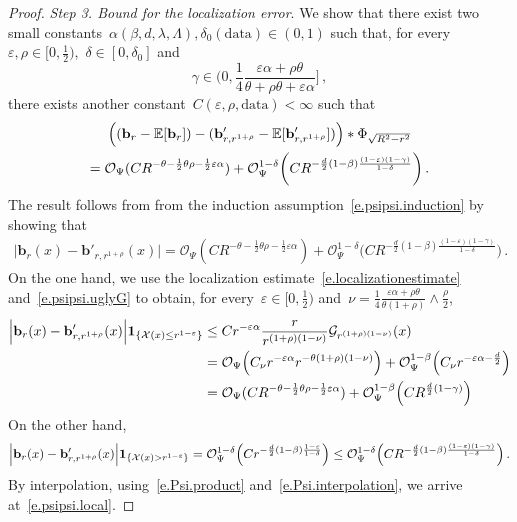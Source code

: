 \documentclass[11pt,twoside]{article} %
\numberwithin{equation}{section}
\theoremstyle{definition}
\newcommand{\eps}{\varepsilon}
\renewcommand{\b}{\ensuremath{\mathbf{b}}}
\newcommand{\ep}{\eps}
\newcommand{\E}{\mathbb{E}}
\newcommand{\X}{\mathcal{X}}
\renewcommand{\O}{\mathcal{O}}
\newcommand{\indc}{\boldsymbol{1}}
\newcommand{\data}{\mathrm{data}}
\begin{document}
\begin{proof}
\smallskip 


\emph{Step 3. Bound for the localization error}. 
We show that there exist two small constants~$\alpha(\beta,d,\lambda,\Lambda),\delta_0(\data) \in (0,1)$ such that, for every~$\ep,\rho \in [0,\frac12)$,~$\delta \in [0,\delta_0]$ and
\begin{equation} \label{e.psipsi.gamma1}
\gamma 
\in 
\biggl( 0, \frac14 \frac{\ep \alpha + \rho \theta}{\theta + \rho \theta + \ep\alpha} \biggl]\,, 
\end{equation}
there exists another constant~$C(\ep,\rho,\data) < \infty$ such that
\begin{multline}  \label{e.psipsi.local.buckle}
\Bigl( (\b_r - \E [ \b_r ]) - (\b'_{r,r^{1+\rho} } - \E [ \b'_{r,r^{1+\rho} } ] )  \Bigr) \ast \Phi_{\sqrt{R^2-r^2}} 
\\ 
= 
\O_{\Psi} (C R^{- \theta - \frac12 \theta \rho  - \frac12 \ep \alpha }) +  \O_{\Psi}^{1-\delta}\biggl(C R^{- \frac{d}{2}(1-\beta)  \frac{(1-\ep)(1 - \gamma)}{1-\delta}}  \biggr) 
\,.
\end{multline}
The result follows from from the induction assumption~\eqref{e.psipsi.induction} by showing that
\begin{align} \label{e.psipsi.local}
\Big| 
\b_r(x)  - \b'_{r,r^{1+\rho}}(x)
\Big|
= 
\O_{\Psi} (C R^{- \theta - \frac12 \theta \rho  - \frac12  \ep \alpha}) +  \O_{\Psi}^{1-\delta}\biggl(C R^{- \frac{d}{2}(1-\beta)  \frac{(1-\ep)(1 - \gamma)}{1-\delta}} \biggr) 
\,.
\end{align}
On the one hand, we use the localization estimate~\eqref{e.localizationestimate} and~\eqref{e.psipsi.uglyG} to obtain, for every~$\ep \in [0,\frac12)$ and~$\nu = \frac{1}{4} \frac{\ep \alpha+\rho \theta}{\theta(1+\rho)} \wedge \frac \rho2$, 
\begin{align} \notag  
\Big| 
\b_r(x)  - \b'_{r,r^{1+\rho}}(x)
\Big| 
\indc_{\{ \X(x) \leq r^{1- \ep}   \} }
&
\leq
C r^{-\ep \alpha} \frac{r}{r^{(1+\rho)(1-\nu)}}\mathcal{G}_{r^{(1+\rho)(1-\nu)}}(x)
\\ 
\notag &
= 
\O_{\Psi} \Bigl(C_\nu r^{-\ep \alpha} r^{- \theta(1+\rho)(1-\nu)}\Bigr)
+ 
\O_{\Psi}^{1-\beta}\Bigl( C_\nu r^{-\ep \alpha -\frac d2}\Bigr)
\\ 
\notag &
= 
 \O_{\Psi} (C R^{- \theta - \frac12 \theta \rho  - \frac12 \ep \alpha }) 
 + 
\O_{\Psi}^{1-\beta}\Bigl( C R^{\frac d2 (1-\gamma)}\Bigr)
\end{align}
On the other hand,
\begin{equation*}  
\Big| 
\b_r(x)  - \b'_{r,r^{1+\rho}}(x)
\Big| 
\indc_{\{ \X(x) > r^{1- \ep}   \} }
= 
\O_{\Psi}^{1-\delta}  \Bigl( C r^{-\frac d2(1-\beta)\frac{1-\ep}{1-\delta}}\Bigr) 
\leq 
\O_{\Psi}^{1-\delta}  \Bigl( C R^{- \frac{d}{2}(1-\beta)   \frac{(1-\ep)(1 - \gamma)}{1-\delta}}  \Bigr) 
\,.
\end{equation*}
By interpolation, using~\eqref{e.Psi.product} and~\eqref{e.Psi.interpolation}, we arrive at~\eqref{e.psipsi.local}. 


\end{proof}
\end{document}
